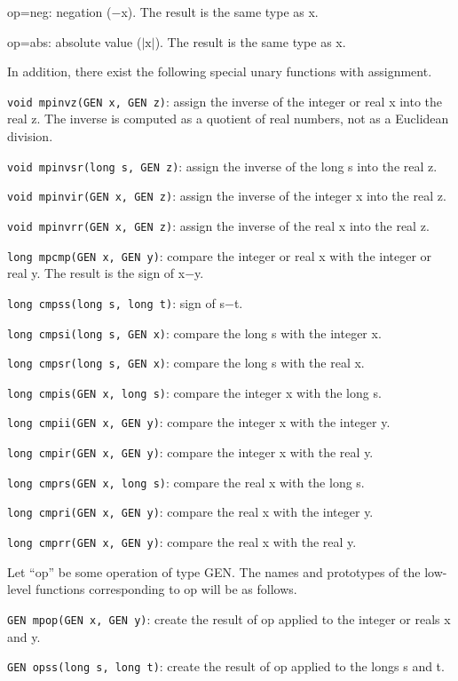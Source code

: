 op=neg: negation ($-$x). The result is the same type as x.

op=abs: absolute value ($|\text{x}|$). The result is the same type as x.

In addition, there exist the following special unary functions with assignment.

{\tt void mpinvz(GEN x, GEN z)}: assign the inverse of the integer or real x
into the real z. The inverse is computed as a quotient of real numbers, not as
a Euclidean division.

{\tt void mpinvsr(long s, GEN z)}: assign the inverse of the long s into the
real z.

{\tt void mpinvir(GEN x, GEN z)}: assign the inverse of the integer x into the
real z.

{\tt void mpinvrr(GEN x, GEN z)}: assign the inverse of the real x into the
real z.


{\tt long mpcmp(GEN x, GEN y)}: compare the integer or real x with the integer
or real y. The result is the sign of x$-$y.

{\tt long cmpss(long s, long t)}: sign of s$-$t.

{\tt long cmpsi(long s, GEN x)}: compare the long s with the integer x.

{\tt long cmpsr(long s, GEN x)}: compare the long s with the real x.

{\tt long cmpis(GEN x, long s)}: compare the integer x with the long s.

{\tt long cmpii(GEN x, GEN y)}: compare the integer x with the integer y.

{\tt long cmpir(GEN x, GEN y)}: compare the integer x with the real y.

{\tt long cmprs(GEN x, long s)}: compare the real x with the long s.

{\tt long cmpri(GEN x, GEN y)}: compare the real x with the integer y.

{\tt long cmprr(GEN x, GEN y)}: compare the real x with the real y.


Let ``op'' be some operation of type GEN. The names and prototypes of the 
low-level functions corresponding to op will be as follows.

{\tt GEN mpop(GEN x, GEN y)}: create the result of op applied to the integer
or reals x and y.

{\tt GEN opss(long s, long t)}: create the result of op applied to the longs
s and t.

